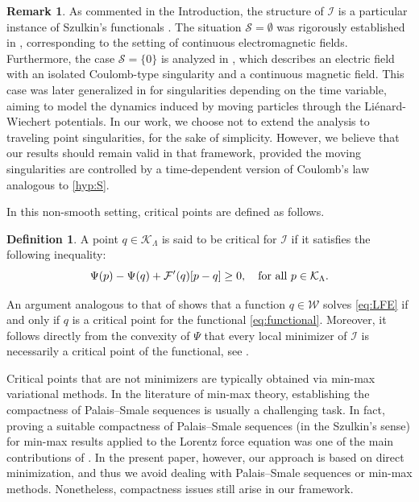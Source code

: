 \documentclass{article}
\newcommand{\boK}{\mathcal{K}}
\newcommand{\boI}{\mathcal{I}}
\newcommand{\boW}{\mathcal{W}}
\newcommand{\boS}{\mathcal{S}}
\theoremstyle{definition}
\newtheorem{remark}{Remark}[section]
\newtheorem{definition}{Definition}[section]
\begin{document}
\begin{remark}
    As commented in the Introduction, the structure of $\boI$ is a particular instance of Szulkin's functionals \cite{Szu}. The situation $\boS=\emptyset$ was rigorously established in \cite{ABT}, corresponding to the setting of continuous electromagnetic fields. Furthermore, the case $\boS=\{0\}$ is analyzed in \cite{AS,Ber1}, which describes an electric field with an isolated Coulomb-type singularity and a continuous magnetic field. This case was later generalized in \cite{BosDamPap} for singularities depending on the time variable, aiming to model the dynamics induced by moving particles through the Liénard-Wiechert potentials. In our work, we choose not to extend the analysis to traveling point singularities, for the sake of simplicity. However, we believe that our results should remain valid in that framework, provided the moving singularities are controlled by a time-dependent version of Coulomb’s law analogous to \eqref{hyp:S}.
\end{remark}
In this non-smooth setting, critical points are defined as follows.
\begin{definition}
	A point $q\in \boK_\Lambda$ is said to be critical for $\boI$ if it satisfies the following inequality:
	\begin{equation}\label{CriticalPoint}
		\Psi(p)-\Psi(q)+\mathcal{F}'(q)[p-q]\geq 0,\quad \hbox{for all }p\in \boK_\Lambda.
	\end{equation}
\end{definition}\noindent
An argument analogous to that of \cite[Theorem 6]{ABT} shows that a function $q\in\boW$ solves \eqref{eq:LFE} if and only if $q$ is a critical point for the functional \eqref{eq:functional}. Moreover, it follows directly from the convexity of $\Psi$ that every local minimizer of $\boI$ is necessarily a critical point of the functional, see \cite[Proposition 1.1]{Szu}.

Critical points that are not minimizers are typically obtained via min-max variational methods. In the literature of min-max theory, establishing the compactness of Palais--Smale sequences is usually a challenging task. In fact, proving a suitable compactness of Palais--Smale sequences (in the Szulkin's sense) for min-max results applied to the Lorentz force equation was one of the main contributions of \cite{ABT}. In the present paper, however, our approach is based on direct minimization, and thus we avoid dealing with Palais--Smale sequences or min-max methods. Nonetheless, compactness issues still arise in our framework.
\end{document}
